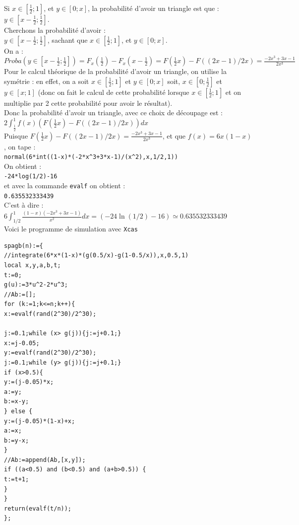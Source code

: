 \documentclass[a4paper,11pt]{book}
\begin{document}
Si $x\in [\frac{1}{2};1]$, et $y\in[0;x]$, la probabilit\'e d'avoir un triangle 
est que :\\
$y\in[x-\frac{1}{2};\frac{1}{2}]$.\\
 Cherchons la probabilit\'e d'avoir :\\
$y\in[x-\frac{1}{2};\frac{1}{2}]$, sachant que $x\in [\frac{1}{2};1]$, et $y\in[0;x]$.\\
On a :\\
$Proba(y\in[x-\frac{1}{2};\frac{1}{2}])=F_x(\frac{1}{2})-F_x(x-\frac{1}{2})=F(\frac{1}{2}x)-F((2x-1)/2x)=\frac{-2x^3+3x-1}{2x^3}$\\
Pour le calcul th\'eorique de la probabilit\'e d'avoir un triangle, on utilise 
la sym\'etrie : en effet, on a soit $x\in [\frac{1}{2};1]$ et  
$y\in[0;x]$ soit, $x\in [0;\frac{1}{2}]$ et  $y\in[x;1]$ (donc on fait le calcul de 
cette probabilit\'e lorsque $x\in [\frac{1}{2};1]$ et on multiplie par 2 cette 
probabilit\'e pour avoir le r\'esultat).\\
Donc la probabilit\'e d'avoir un triangle, avec ce choix de d\'ecoupage est :\\
 $\displaystyle 2\int_{\frac{1}{2}}^1 f(x)(F(\frac{1}{2}x)-F((2x-1)/2x))dx$\\
Puisque $\displaystyle F(\frac{1}{2}x)-F((2x-1)/2x)=\frac{-2x^3+3x-1}{2x^3}$, et que
$f(x)=6x(1-x)$, on tape :\\
{\tt normal(6*int((1-x)*(-2*x\verb|^|3+3*x-1)/(x\verb|^|2),x,1/2,1))}\\
On obtient :\\
{\tt -24*log(1/2)-16}\\
et avec la commande {\tt evalf} on obtient :\\
{\tt 0.635532333439}\\
C'est \`a dire :\\
$\displaystyle 6\int_{1/2}^1\frac{(1-x)(-2x^3+3x-1)}{x^2} dx=(-24\ln(1/2)-16)
\simeq 0.635532333439$\\
Voici le programme de simulation avec {\tt Xcas}

\begin{verbatim}
spagb(n):={
//integrate(6*x*(1-x)*(g(0.5/x)-g(1-0.5/x)),x,0.5,1) 
local x,y,a,b,t;
t:=0;
g(u):=3*u^2-2*u^3;
//Ab:=[];
for (k:=1;k<=n;k++){
x:=evalf(rand(2^30)/2^30);

j:=0.1;while (x> g(j)){j:=j+0.1;}
x:=j-0.05;
y:=evalf(rand(2^30)/2^30);
j:=0.1;while (y> g(j)){j:=j+0.1;}
if (x>0.5){
y:=(j-0.05)*x;
a:=y;
b:=x-y;
} else {
y:=(j-0.05)*(1-x)+x;
a:=x;
b:=y-x;
}
//Ab:=append(Ab,[x,y]);
if ((a<0.5) and (b<0.5) and (a+b>0.5)) {
t:=t+1;
}
}
return(evalf(t/n));
};
\end{verbatim}
\end{document}

